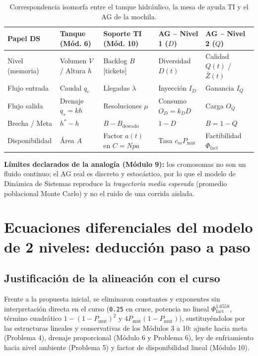 \documentclass[11pt,a4paper]{article}
\begin{document}
\begin{table}[h]
\centering
\caption{Correspondencia isomorfa entre el tanque hidr\'aulico, la mesa de ayuda TI y el AG de la mochila.}
\begin{tabular}{@{}p{2.4cm}p{2.8cm}p{2.9cm}p{3.0cm}p{3.0cm}@{}}
\toprule
\textbf{Papel DS} & \textbf{Tanque (M\'od. 6)} & \textbf{Soporte TI (M\'od. 10)} & \textbf{AG -- Nivel 1 ($D$)} & \textbf{AG -- Nivel 2 ($Q$)} \\
\midrule
Nivel (memoria) & Volumen $V$ / Altura $h$ & Backlog $B$ [tickets] & Diversidad $D(t)$ & Calidad $Q(t)$ / $\bar{Z}(t)$ \\
Flujo entrada & Caudal $q_e$ & Llegadas $\lambda$ & Inyecci\'on $I_D$ & Ganancia $I_Q$ \\
Flujo salida & Drenaje $q_s = k h$ & Resoluciones $\mu$ & Consumo $O_D = k_D D$ & Carga $O_Q$ \\
Brecha / Meta & $h^* - h$ & $B - B_{\text{deseado}}$ & $1 - D$ & $B = 1 - Q$ \\
Disponibilidad & \'Area $A$ & Factor $a(t)$ en $C=Npa$ & Tasa $c_m P_{\text{mut}}$ & Factibilidad $\Phi_{\text{fact}}$ \\
\bottomrule
\end{tabular}
\end{table}

\textbf{L\'imites declarados de la analog\'ia (M\'odulo 9):} los cromosomas no son un fluido continuo; el AG real es discreto y estoc\'astico, por lo que el modelo de Din\'amica de Sistemas reproduce la \emph{trayectoria media esperada} (promedio poblacional Monte Carlo) y no el ruido de una corrida aislada.

\section{Ecuaciones diferenciales del modelo de 2 niveles: deducci\'on paso a paso}

\subsection{Justificaci\'on de la alineaci\'on con el curso}

Frente a la propuesta inicial, se eliminaron constantes y exponentes sin interpretaci\'on directa en el curso (\texttt{0.25} en cruce, potencia no lineal $\Phi_{\text{fact}}^{1.6558}$, t\'ermino cuadr\'atico $1-(1-P_{\text{mut}})^2$ y $4P_{\text{mut}}(1-P_{\text{mut}})$), sustituy\'endolos por las estructuras lineales y conservativas de los M\'odulos 3 a 10: ajuste hacia meta (Problema 4), drenaje proporcional (M\'odulo 6 y Problema 6), ley de enfriamiento hacia nivel ambiente (Problema 5) y factor de disponibilidad lineal (M\'odulo 10).
\end{document}
